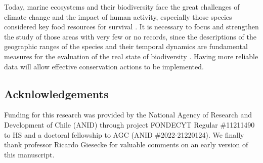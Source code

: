 \documentclass[12pt,authoryear]{elsarticle}
\begin{document}
Today, marine ecosystems and their biodiversity face the great challenges of climate change and the impact of human activity, especially those species considered key food resources for survival \citep{hollowed2013,ramirez2017climate,ohara2021}. It is necessary to focus and strengthen the study of those areas with very few or no records, since the descriptions of the geographic ranges of the species and their temporal dynamics are fundamental measures for the evaluation of the real state of biodiversity \citep{lenoir2020species, oliver2021}. Having more reliable data will allow effective conservation actions to be implemented.

\subsection*{Acknlowledgements}
Funding for this research was provided by the National Agency of Research and Development of Chile (ANID) through project FONDECYT Regular \#11211490 to HS and a doctoral fellowship to AGC (ANID \#2022-21220124).  We finally thank professor Ricardo Giesecke for valuable comments on an early version of this manuscript.

% 
% 
\end{document}
